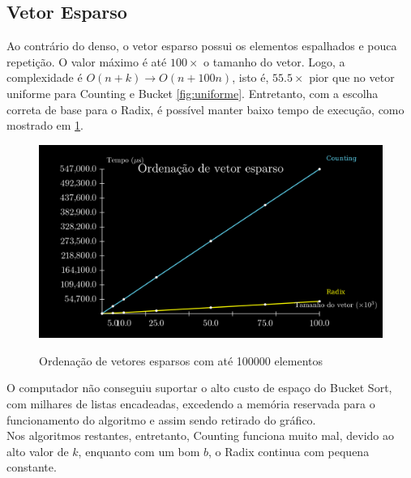 \documentclass[fontsize=11pt]{article}
\begin{document}
    \subsection{Vetor Esparso}
      Ao contrário do denso, o vetor esparso possui os elementos espalhados e pouca repetição.
      O valor máximo é até $100\times$ o tamanho do vetor. Logo, a complexidade é 
      $O(n+k) \rightarrow O(n+100n)$, isto é, $55.5\times$ pior que no vetor uniforme para Counting e 
      Bucket \ref{fig:uniforme}. Entretanto, com a escolha correta de base para o Radix, é possível manter baixo tempo de
      execução, como mostrado em \ref{fig:esparso}.
      \begin{figure}[H]
        \caption{Ordenação de vetores esparsos com até 100000 elementos}
        \includegraphics[width=\textwidth]{esparso1.png}
        \label{fig:esparso}
      \end{figure}
      O computador não conseguiu suportar o alto custo de espaço do Bucket Sort, com milhares de listas
      encadeadas, excedendo a memória reservada para o funcionamento do algoritmo e assim sendo retirado
      do gráfico. 
      \\ Nos algoritmos restantes, entretanto, Counting funciona muito mal, devido ao alto valor de $k$, 
      enquanto com um bom $b$, o Radix continua com pequena constante.
    \newpage
\end{document}

